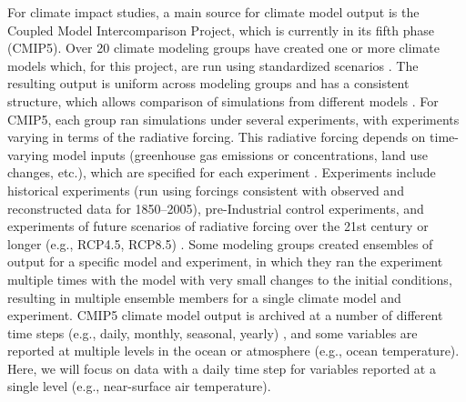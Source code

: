 For climate impact studies, a main source for climate model output is
the Coupled Model Intercomparison Project, which is currently in its
fifth phase (CMIP5). Over 20 climate modeling groups have created one or
more climate models which, for this project, are run using standardized
scenarios \citep{taylor2012overview}. The resulting output is uniform
across modeling groups and has a consistent structure, which allows
comparison of simulations from different models \citep{IPCCch9}. For
CMIP5, each group ran simulations under several experiments, with
experiments varying in terms of the radiative forcing. This radiative
forcing depends on time-varying model inputs (greenhouse gas emissions
or concentrations, land use changes, etc.), which are specified for each
experiment \citep{taylor2012overview, IPCCch9}. Experiments include
historical experiments (run using forcings consistent with observed and
reconstructed data for 1850--2005), pre-Industrial control experiments,
and experiments of future scenarios of radiative forcing over the 21st
century or longer (e.g., RCP4.5, RCP8.5) \citep{taylor2012overview}.
Some modeling groups created ensembles of output for a specific model
and experiment, in which they ran the experiment multiple times with the
model with very small changes to the initial conditions, resulting in
multiple ensemble members for a single climate model and experiment.
CMIP5 climate model output is archived at a number of different time
steps (e.g., daily, monthly, seasonal, yearly) \citep{taylor2010cmip5},
and some variables are reported at multiple levels in the ocean or
atmosphere (e.g., ocean temperature). Here, we will focus on data with a
daily time step for variables reported at a single level (e.g.,
near-surface air temperature).

